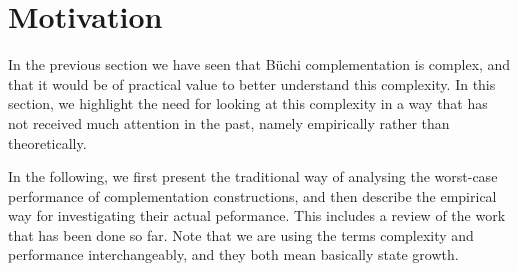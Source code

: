 


\section{Motivation}
In the previous section we have seen that Büchi complementation is complex, and that it would be of practical value to better understand this complexity. In this section, we highlight the need for looking at this complexity in a way that has not received much attention in the past, namely empirically rather than theoretically.

In the following, we first present the traditional way of analysing the worst-case performance of complementation constructions, and then describe the empirical way for investigating their actual peformance. This includes a review of the work that has been done so far. Note that we are using the terms complexity and performance interchangeably, and they both mean basically state growth.

